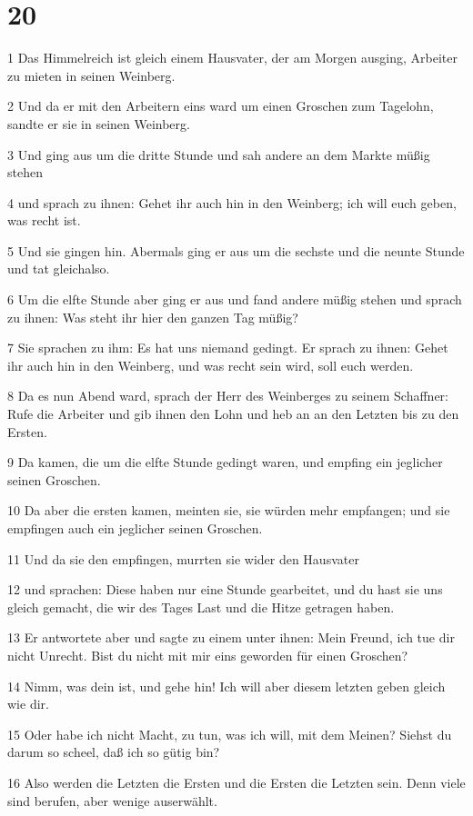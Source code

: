 \chapter{20}

\par 1 Das Himmelreich ist gleich einem Hausvater, der am Morgen ausging, Arbeiter zu mieten in seinen Weinberg.
\par 2 Und da er mit den Arbeitern eins ward um einen Groschen zum Tagelohn, sandte er sie in seinen Weinberg.
\par 3 Und ging aus um die dritte Stunde und sah andere an dem Markte müßig stehen
\par 4 und sprach zu ihnen: Gehet ihr auch hin in den Weinberg; ich will euch geben, was recht ist.
\par 5 Und sie gingen hin. Abermals ging er aus um die sechste und die neunte Stunde und tat gleichalso.
\par 6 Um die elfte Stunde aber ging er aus und fand andere müßig stehen und sprach zu ihnen: Was steht ihr hier den ganzen Tag müßig?
\par 7 Sie sprachen zu ihm: Es hat uns niemand gedingt. Er sprach zu ihnen: Gehet ihr auch hin in den Weinberg, und was recht sein wird, soll euch werden.
\par 8 Da es nun Abend ward, sprach der Herr des Weinberges zu seinem Schaffner: Rufe die Arbeiter und gib ihnen den Lohn und heb an an den Letzten bis zu den Ersten.
\par 9 Da kamen, die um die elfte Stunde gedingt waren, und empfing ein jeglicher seinen Groschen.
\par 10 Da aber die ersten kamen, meinten sie, sie würden mehr empfangen; und sie empfingen auch ein jeglicher seinen Groschen.
\par 11 Und da sie den empfingen, murrten sie wider den Hausvater
\par 12 und sprachen: Diese haben nur eine Stunde gearbeitet, und du hast sie uns gleich gemacht, die wir des Tages Last und die Hitze getragen haben.
\par 13 Er antwortete aber und sagte zu einem unter ihnen: Mein Freund, ich tue dir nicht Unrecht. Bist du nicht mit mir eins geworden für einen Groschen?
\par 14 Nimm, was dein ist, und gehe hin! Ich will aber diesem letzten geben gleich wie dir.
\par 15 Oder habe ich nicht Macht, zu tun, was ich will, mit dem Meinen? Siehst du darum so scheel, daß ich so gütig bin?
\par 16 Also werden die Letzten die Ersten und die Ersten die Letzten sein. Denn viele sind berufen, aber wenige auserwählt.
